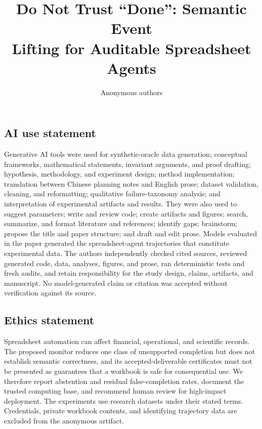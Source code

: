 \documentclass{article}
\title{Do Not Trust ``Done'': Semantic Event\\
Lifting for Auditable Spreadsheet Agents}
\author{Anonymous authors}
\begin{document}
\maketitle







\label{maintext:end}

\subsection*{AI use statement}
Generative AI tools were used for synthetic-oracle data generation; conceptual
frameworks, mathematical statements, invariant arguments, and proof drafting;
hypothesis, methodology, and experiment design; method implementation;
translation between Chinese planning notes and English prose; dataset
validation, cleaning, and reformatting; qualitative failure-taxonomy analysis;
and interpretation of experimental artifacts and results. They were also used
to suggest parameters; write and review code; create artifacts and figures;
search, summarize, and format literature and references; identify gaps;
brainstorm; propose the title and paper structure; and draft and edit prose.
Models evaluated in the paper generated the spreadsheet-agent trajectories
that constitute experimental data. The authors independently checked cited
sources, reviewed generated code, data, analyses, figures, and prose, ran
deterministic tests and fresh audits, and retain responsibility for the study
design, claims, artifacts, and manuscript. No model-generated claim or citation
was accepted without verification against its source.

\subsection*{Ethics statement}
Spreadsheet automation can affect financial, operational, and scientific
records. The proposed monitor reduces one class of unsupported completion but
does not establish semantic correctness, and its accepted-deliverable
certificates must not be
presented as guarantees that a workbook is safe for consequential use. We
therefore report abstention and residual false-completion rates, document the
trusted computing base, and recommend human review for high-impact deployment.
The experiments use research datasets under their stated terms. Credentials,
private workbook contents, and identifying trajectory data are excluded from
the anonymous artifact.
\end{document}
